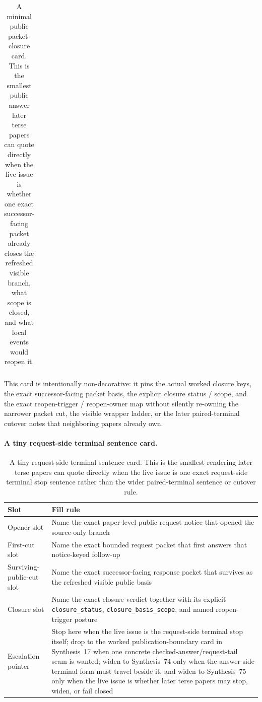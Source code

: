 \documentclass[11pt]{article}
\begin{document}
\begin{table}[t]
\begin{tabularx}{\linewidth}{@{}lX@{}}
\bottomrule
\end{tabularx}
\caption{A minimal public packet-closure card. This is the smallest public answer later terse papers can quote directly when the live issue is whether one exact successor-facing packet already closes the refreshed visible branch, what scope is closed, and what local events would reopen it.}
\label{tab:minimal-public-packet-closure-card}
\end{table}

This card is intentionally non-decorative: it pins the actual worked closure keys, the exact successor-facing packet basis, the explicit closure status / scope, and the exact reopen-trigger / reopen-owner map without silently re-owning the narrower packet cut, the visible wrapper ladder, or the later paired-terminal cutover notes that neighboring papers already own.\cite{series:workedexample}

\paragraph{A tiny request-side terminal sentence card.}
\begin{table}[t]
\centering
\small
\begin{tabularx}{\linewidth}{@{}lX@{}}
\toprule
Slot & Fill rule \\
\midrule
Opener slot & Name the exact paper-level public request notice that opened the source-only branch \\
First-cut slot & Name the exact bounded request packet that first answers that notice-keyed follow-up \\
Surviving-public-cut slot & Name the exact successor-facing response packet that survives as the refreshed visible public basis \\
Closure slot & Name the exact closure verdict together with its explicit \nolinkurl{closure_status}, \nolinkurl{closure_basis_scope}, and named reopen-trigger posture \\
Escalation pointer & Stop here when the live issue is the request-side terminal stop itself; drop to the worked publication-boundary card in Synthesis~17 when one concrete checked-answer/request-tail seam is wanted; widen to Synthesis~74 only when the answer-side terminal form must travel beside it, and widen to Synthesis~75 only when the live issue is whether later terse papers may stop, widen, or fail closed \\
\bottomrule
\end{tabularx}
\caption{A tiny request-side terminal sentence card. This is the smallest rendering later terse papers can quote directly when the live issue is one exact request-side terminal stop sentence rather than the wider paired-terminal sentence or cutover rule.}
\label{tab:request-side-terminal-sentence-card}
\end{table}
\end{document}
